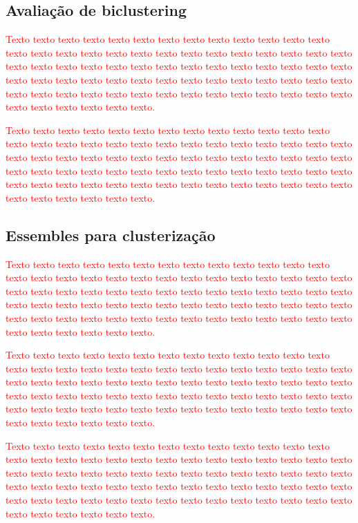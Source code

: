\documentclass[normaltoc, espacoumemeio, pnumromarab,ruledheader]{abnt}
\begin{document}
	 \subsection{Avaliação de biclustering}
	
	\textcolor{red}{Texto texto texto texto texto texto texto texto texto texto texto texto texto texto texto texto texto texto texto texto texto texto texto texto texto texto texto texto texto texto texto texto texto texto texto texto texto texto texto texto texto texto texto texto texto texto texto texto texto texto texto texto texto texto texto texto texto texto texto texto texto texto texto texto texto texto texto texto texto texto texto texto texto texto texto.}
	
	\textcolor{red}{Texto texto texto texto texto texto texto texto texto texto texto texto texto texto texto texto texto texto texto texto texto texto texto texto texto texto texto texto texto texto texto texto texto texto texto texto texto texto texto texto texto texto texto texto texto texto texto texto texto texto texto texto texto texto texto texto texto texto texto texto texto texto texto texto texto texto texto texto texto texto texto texto texto texto texto.}

	 \subsection{Essembles para clusterização}

\textcolor{red}{Texto texto texto texto texto texto texto texto texto texto texto texto texto texto texto texto texto texto texto texto texto texto texto texto texto texto texto texto texto texto texto texto texto texto texto texto texto texto texto texto texto texto texto texto texto texto texto texto texto texto texto texto texto texto texto texto texto texto texto texto texto texto texto texto texto texto texto texto texto texto texto texto texto texto texto.}

\textcolor{red}{Texto texto texto texto texto texto texto texto texto texto texto texto texto texto texto texto texto texto texto texto texto texto texto texto texto texto texto texto texto texto texto texto texto texto texto texto texto texto texto texto texto texto texto texto texto texto texto texto texto texto texto texto texto texto texto texto texto texto texto texto texto texto texto texto texto texto texto texto texto texto texto texto texto texto texto.}

\textcolor{red}{Texto texto texto texto texto texto texto texto texto texto texto texto texto texto texto texto texto texto texto texto texto texto texto texto texto texto texto texto texto texto texto texto texto texto texto texto texto texto texto texto texto texto texto texto texto texto texto texto texto texto texto texto texto texto texto texto texto texto texto texto texto texto texto texto texto texto texto texto texto texto texto texto texto texto texto.}
		
\end{document}
